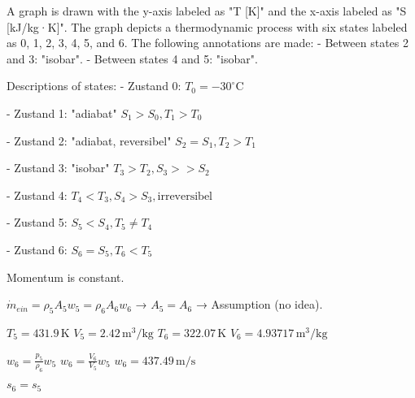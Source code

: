 A graph is drawn with the y-axis labeled as "T [K]" and the x-axis labeled as "S [kJ/kg·K]". The graph depicts a thermodynamic process with six states labeled as 0, 1, 2, 3, 4, 5, and 6. The following annotations are made:  
- Between states 2 and 3: "isobar".  
- Between states 4 and 5: "isobar".  

Descriptions of states:  
- Zustand 0:  
  \( T_0 = -30^\circ \text{C} \)  

- Zustand 1:  
  "adiabat"  
  \( S_1 > S_0, T_1 > T_0 \)  

- Zustand 2:  
  "adiabat, reversibel"  
  \( S_2 = S_1, T_2 > T_1 \)  

- Zustand 3:  
  "isobar"  
  \( T_3 > T_2, S_3 >> S_2 \)  

- Zustand 4:  
  \( T_4 < T_3, S_4 > S_3, \text{irreversibel} \)  

- Zustand 5:  
  \( S_5 < S_4, T_5 \neq T_4 \)  

- Zustand 6:  
  \( S_6 = S_5, T_6 < T_5 \)

Momentum is constant.  

\( \dot{m}_{ein} = \rho_5 A_5 w_5 = \rho_6 A_6 w_6 \) → \( A_5 = A_6 \) → Assumption (no idea).  

\( T_5 = 431.9 \, \text{K} \)  
\( V_5 = 2.42 \, \text{m}^3/\text{kg} \)  
\( T_6 = 322.07 \, \text{K} \)  
\( V_6 = 4.93717 \, \text{m}^3/\text{kg} \)  

\( w_6 = \frac{p_5}{\rho_6} w_5 \)  
\( w_6 = \frac{V_6}{V_5} w_5 \)  
\( w_6 = 437.49 \, \text{m/s} \)  

\( s_6 = s_5 \)